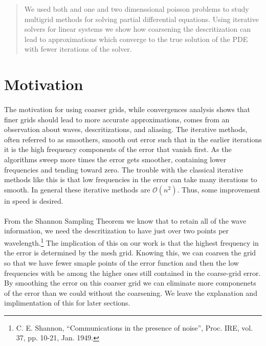 \documentclass[pdftex,12pt,a4paper]{article}
\begin{document}


\vspace{2 cm}

\begin{abstract}
    We used both and one and two dimenssional poisson problems to study multigrid methods for solving partial differential equations. Using iterative solvers for linear systems we show how coarsening the descritization can lead to approximations which converge to the true solution of the PDE with fewer iterations of the solver. 
\end{abstract}

\section{Motivation}
   
    \paragraph*{} The motivation for using coarser grids, while convergences analysis shows that finer grids should lead to more accurate approximations, comes from an observation about waves, descritizations, and aliasing. The iterative methods, often referred to as smoothers, smooth out error such that in the earlier iterations it is the high frequency components of the error that vanish first. As the algorithms sweep more times the error gets smoother, containing lower frequencies and tending toward zero. The trouble with the classical iterative methods like this is that low frequencies in the error can take many iterations to smooth. In general these iterative methods are $\mathcal{O}(n^2)$. Thus, some improvement in speed is desired.

    \paragraph*{} From the Shannon Sampling Theorem we know that to retain all of the wave information, we need the descritization to have just over two points per wavelength.\footnote{C. E. Shannon, ``Communications in the presence of noise'', Proc. IRE, vol. 37, pp. 10-21, Jan. 1949.} The implication of this on our work is that the highest frequency in the error is determined by the mesh grid. Knowing this, we can coarsen the grid so that we have fewer smaple points of the error function and then the low frequencies with be among the higher ones still contained in the coarse-grid error. By smoothing the error on this coarser grid we can eliminate more componenets of the error than we could without the coarsening. We leave the explanation and implimentation of this for later sections.
\end{document}
